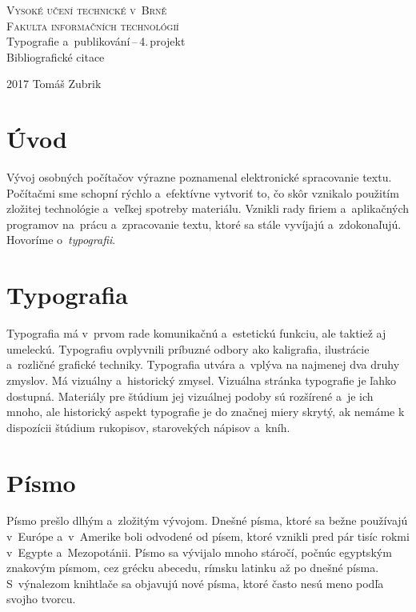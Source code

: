 \documentclass[11pt,a4paper,titlepage]{article}
\begin{document}
\begin{titlepage}
\begin{center}
    {\textsc{\Huge Vysoké učení technické v~Brně}}\\
    \smallskip
    {\huge\textsc{Fakulta informačních technológií}}\\
    \bigskip
    \LARGE{Typografie a~publikování\,--\,4.\,projekt}\\
    \smallskip
    \Huge{Bibliografické citace}\\
\end{center}
    {\Large 2017 \hfill Tomáš Zubrik }
\end{titlepage}

\section{Úvod}
Vývoj osobných počítačov výrazne poznamenal elektronické spracovanie textu. Počítačmi sme schopní rýchlo a~efektívne vytvoriť to, čo skôr vznikalo použitím zložitej technológie a~veľkej spotreby materiálu. Vznikli rady firiem a~aplikačných programov na~prácu a~zpracovanie textu, ktoré sa stále vyvíjajú a~zdokonaľujú. Hovoríme o~\textit{typografii}.
\cite{Rybicka}

\section{Typografia}
Typografia má v~prvom rade komunikačnú a~estetickú funkciu, ale taktiež aj umeleckú. Typografiu ovplyvnili príbuzné odbory ako kaligrafia, ilustrácie a~rozličné grafické techniky.\cite{Hoskova}
Typografia utvára a~vplýva na najmenej dva druhy zmyslov. Má vizuálny a~historický zmysel. Vizuálna stránka typografie je ľahko dostupná. Materiály pre štúdium jej vizuálnej podoby sú rozšírené a~je ich mnoho, ale historický aspekt typografie je do značnej miery skrytý, ak nemáme k dispozícii štúdium rukopisov, starovekých nápisov a~kníh.\cite{Bringhurst} 

\section{Písmo}
Písmo prešlo dlhým a~zložitým vývojom. Dnešné písma, ktoré sa bežne používajú v~Európe a~v~Amerike boli odvodené od písem, ktoré vznikli pred pár tisíc rokmi v~Egypte a~Mezopotánii. Písmo sa vývijalo mnoho stáročí, počnúc egyptským znakovým písmom, cez grécku abecedu, rímsku latinku až po dnešné písma. S~výnalezom knihtlače sa objavujú nové písma, ktoré často nesú meno podľa svojho tvorcu.  \cite{Cerny}
\end{document}
